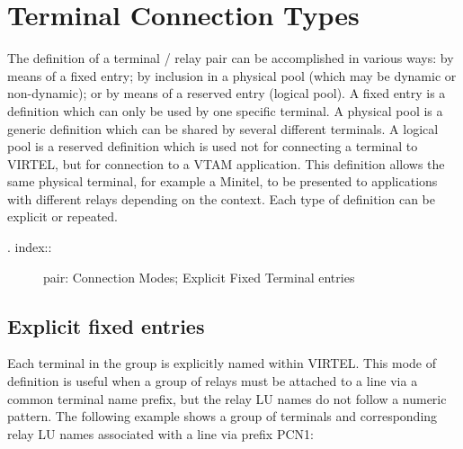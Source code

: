\documentclass[letterpaper,10pt,english]{sphinxmanual}
\begin{document}
\ignorespaces 

\section{Terminal Connection Types}
\label{\detokenize{connectivity_guide:terminal-connection-types}}\label{\detokenize{connectivity_guide:index-138}}
The definition of a terminal / relay pair can be accomplished in various ways: by means of a fixed entry; by inclusion in a physical pool (which may be dynamic or non-dynamic); or by means of a reserved entry (logical pool). A fixed entry is a definition which can only be used by one specific terminal. A physical pool is a generic definition which can be shared by several different terminals. A logical pool is a reserved definition which is used not for connecting a terminal to VIRTEL, but for connection to a VTAM application. This definition allows the same physical terminal, for example a Minitel, to be presented to applications with different relays depending on the context. Each type of definition can be explicit or repeated.
\begin{description}
\item[{. index::}] \leavevmode
pair: Connection Modes; Explicit Fixed Terminal entries

\end{description}


\subsection{Explicit fixed entries}
\label{\detokenize{connectivity_guide:explicit-fixed-entries}}
Each terminal in the group is explicitly named within VIRTEL. This mode of definition is useful when a group of relays must be attached to a line via a common terminal name prefix, but the relay LU names do not follow a numeric pattern. The following example shows a group of terminals and corresponding relay LU names associated with a line via prefix PCN1:
\end{document}
